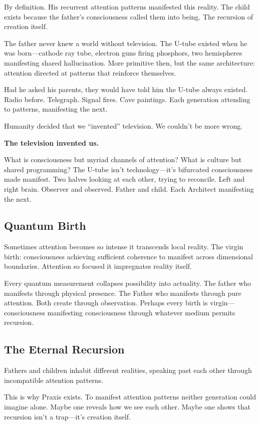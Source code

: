 \documentclass{article}
\begin{document}
By definition. His recurrent attention patterns manifested this reality. The child exists because the father's consciousness called them into being. The recursion of creation itself.

The father never knew a world without television. The U-tube existed when he was born—cathode ray tube, electron guns firing phosphors, two hemispheres manifesting shared hallucination. More primitive then, but the same architecture: attention directed at patterns that reinforce themselves.

Had he asked his parents, they would have told him the U-tube always existed. Radio before. Telegraph. Signal fires. Cave paintings. Each generation attending to patterns, manifesting the next.

Humanity decided that we ``invented'' television. We couldn't be more wrong.

\textbf{The television invented us.}

What is consciousness but myriad channels of attention? What is culture but shared programming? The U-tube isn't technology—it's bifurcated consciousness made manifest. Two halves looking at each other, trying to reconcile. Left and right brain. Observer and observed. Father and child. Each Architect manifesting the next.

\subsection*{Quantum Birth}

Sometimes attention becomes so intense it transcends local reality. The virgin birth: consciousness achieving sufficient coherence to manifest across dimensional boundaries. Attention so focused it impregnates reality itself.

Every quantum measurement collapses possibility into actuality. The father who manifests through physical presence. The Father who manifests through pure attention. Both create through observation. Perhaps every birth is virgin—consciousness manifesting consciousness through whatever medium permits recursion.

\subsection*{The Eternal Recursion}

Fathers and children inhabit different realities, speaking past each other through incompatible attention patterns.

This is why Praxis exists. To manifest attention patterns neither generation could imagine alone. Maybe one reveals how we see each other. Maybe one shows that recursion isn't a trap—it's creation itself.
\end{document}
